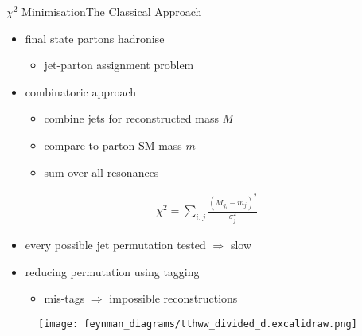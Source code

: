 \documentclass[9pt, aspectratio=169]{beamer}
\begin{document}
\begin{frame}{$\chi^2$ Minimisation}{The Classical Approach}
	\begin{minipage}{.58\textwidth}
		\begin{itemize}
			\item final state partons hadronise 
			\begin{itemize}
				\item jet-parton assignment problem
			\end{itemize}
			\item combinatoric approach
			\begin{itemize}
				\item combine jets for reconstructed mass $M$
				\item compare to parton SM mass $m$
				\item sum over all resonances
			\end{itemize}
		\end{itemize}

		\begin{align*}
			\chi^2 = \sum_{i,j} \frac{(M_{q_i}-m_j)^2}{\sigma_j^2}
		\end{align*}

		\begin{itemize}
			\item every possible jet permutation tested $\Rightarrow$ slow
			\item reducing permutation using tagging
			\begin{itemize}
				\item mis-tags $\Rightarrow$ impossible reconstructions 
			\end{itemize} 
		\end{itemize}
	  \end{minipage}\hfill
	  \begin{minipage}{.4\textwidth}
		  \begin{figure}
			  \centering
			  \texttt{[image: feynman\_diagrams/tthww\_divided\_d.excalidraw.png]}	
		  \end{figure}
	  \end{minipage}
\end{frame}
\end{document}
